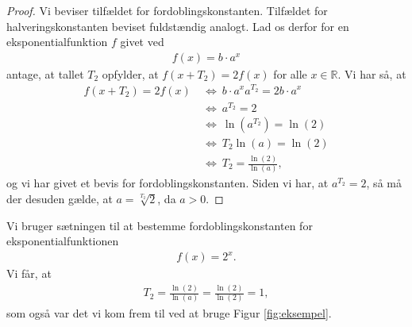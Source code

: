 \documentclass[12pt]{article}
\begin{document}
\begin{proof}
Vi beviser tilfældet for fordoblingskonstanten. Tilfældet for halveringskonstanten beviset fuldstændig analogt. Lad os derfor for en eksponentialfunktion $f$ givet ved
\begin{align*}
f(x) = b\cdot a^x
\end{align*}
antage, at tallet $T_2$ opfylder, at $f(x+T_2) = 2f(x)$ for alle $x\in \mathbb{R}$. Vi har så, at 
\begin{align*}
f(x+T_2) = 2f(x) \ &\Leftrightarrow \ b\cdot a^{x}a^{T_2}=2b\cdot a^x\\
&\Leftrightarrow\ a^{T_2} = 2\\
&\Leftrightarrow\ \ln(a^{T_2}) = \ln(2)\\
&\Leftrightarrow\ T_2\ln(a) = \ln(2)\\
&\Leftrightarrow\ T_2 = \frac{\ln(2)}{\ln(a)},
\end{align*}
og vi har givet et bevis for fordoblingskonstanten. Siden vi har, at $a^{T_2} = 2$, så må der desuden gælde, at $a=\sqrt[T_2]{2}$, da $a>0$. 
\end{proof}

\begin{exa}
	Vi bruger sætningen til at bestemme fordoblingskonstanten for eksponentialfunktionen
	\begin{align*}
		f(x) = 2^x.
	\end{align*}
	Vi får, at 
	\begin{align*}
		T_2 = \frac{\ln(2)}{\ln(a)} = \frac{\ln(2)}{\ln(2)} = 1,
	\end{align*}
	som også var det vi kom frem til ved at bruge Figur \ref{fig:eksempel}.
\end{exa}

\newpage
\end{document}
